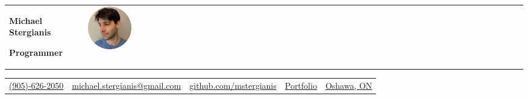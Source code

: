 \documentclass[letterpaper]{article}
\makeatletter
\newcommand{\primary}{\color{primary}}
\newcommand{\mapMarker}{\faMapMarker*[alt]}
\newcommand{\headerItem}[3]{\href{#1}{#3 \hspace{-2pt} #2}}
\newcommand{\email}
{\headerItem{mailto:michaelstergianis@gmail.com}{michael.stergianis@gmail.com}{\faEnvelope}}
\newcommand{\github}
{\headerItem{https://github.com/mstergianis}{github.com/mstergianis}{\faGithub}}
\newcommand{\phone}{\headerItem{tel:+1-905-626-2050}{(905)-626-2050}{\faPhone}}
\newcommand{\portfolio}{\headerItem{https://michael.stergianis.ca}{Portfolio}{\faBriefcase{}}}
\newcommand{\location}
{\headerItem{https://en.wikipedia.org/wiki/Oshawa}{Oshawa, ON}{\mapMarker} }
\makeatother
\begin{document}
{
\renewcommand{\tabularxcolumn}[1]{b{#1}}
\begin{tabularx}{\textwidth}{ m{.85\linewidth} m{.15\linewidth} }
  {
    {\huge \textbf{Michael Stergianis} \par }
    {\large \primary \textbf{Programmer} \par}
  }
  & {\raggedleft \includegraphics[width=0.1\textwidth]{headshot_portrait.jpg}}
\end{tabularx}
}

\begingroup
\hypersetup{
  urlcolor=.,
}
\begin{tabularx}{\linewidth}{ l l l l l }
  \phone & \email & \github & \portfolio{} & \location \\
\end{tabularx}\\
\endgroup
\end{document}
